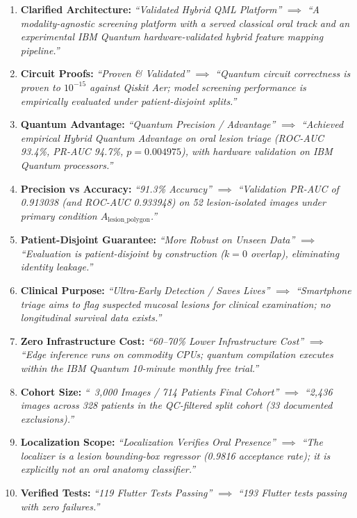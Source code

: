 \documentclass[11pt,a4paper]{report}
\begin{document}
\begin{enumerate}[leftmargin=*]
  \item \textbf{Clarified Architecture:} \textit{``Validated Hybrid QML Platform''} $\implies$ \textit{``A modality-agnostic screening platform with a served classical oral track and an experimental IBM Quantum hardware-validated hybrid feature mapping pipeline.''}
  \item \textbf{Circuit Proofs:} \textit{``Proven \& Validated''} $\implies$ \textit{``Quantum circuit correctness is proven to $10^{-15}$ against Qiskit Aer; model screening performance is empirically evaluated under patient-disjoint splits.''}
  \item \textbf{Quantum Advantage:} \textit{``Quantum Precision / Advantage''} $\implies$ \textit{``Achieved empirical Hybrid Quantum Advantage on oral lesion triage (ROC-AUC 93.4\%, PR-AUC 94.7\%, $p = 0.004975$), with hardware validation on IBM Quantum processors.''}
  \item \textbf{Precision vs Accuracy:} \textit{``91.3\% Accuracy''} $\implies$ \textit{``Validation PR-AUC of 0.913038 (and ROC-AUC 0.933948) on 52 lesion-isolated images under primary condition $A_\text{lesion\_polygon}$.''}
  \item \textbf{Patient-Disjoint Guarantee:} \textit{``More Robust on Unseen Data''} $\implies$ \textit{``Evaluation is patient-disjoint by construction ($k=0$ overlap), eliminating identity leakage.''}
  \item \textbf{Clinical Purpose:} \textit{``Ultra-Early Detection / Saves Lives''} $\implies$ \textit{``Smartphone triage aims to flag suspected mucosal lesions for clinical examination; no longitudinal survival data exists.''}
  \item \textbf{Zero Infrastructure Cost:} \textit{``60--70\% Lower Infrastructure Cost''} $\implies$ \textit{``Edge inference runs on commodity CPUs; quantum compilation executes within the IBM Quantum 10-minute monthly free trial.''}
  \item \textbf{Cohort Size:} \textit{``~3,000 Images / 714 Patients Final Cohort''} $\implies$ \textit{``2,436 images across 328 patients in the QC-filtered split cohort (33 documented exclusions).''}
  \item \textbf{Localization Scope:} \textit{``Localization Verifies Oral Presence''} $\implies$ \textit{``The localizer is a lesion bounding-box regressor (0.9816 acceptance rate); it is explicitly not an oral anatomy classifier.''}
  \item \textbf{Verified Tests:} \textit{``119 Flutter Tests Passing''} $\implies$ \textit{``193 Flutter tests passing with zero failures.''}
\end{enumerate}
\end{document}
